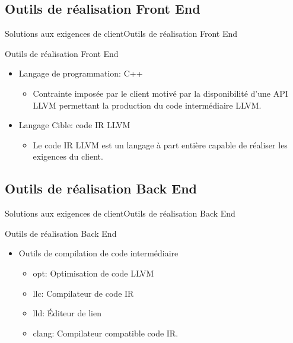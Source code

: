    \subsection{Outils de réalisation Front End}
      \begin{frame}{Solutions aux exigences de client}{Outils de réalisation Front End}
        \begin{block}{Outils de réalisation Front End}
          \begin{itemize}
            \item<1-> Langage de programmation: C++
            \begin{itemize}
              \item<2-> Contrainte imposée par le client motivé par la disponibilité d'une API LLVM permettant la production du code intermédiaire LLVM.
            \end{itemize}
            \item<3-> Langage Cible: code IR LLVM
            \begin{itemize}
              \item<4-> Le code IR LLVM est un langage à part entière capable de réaliser les exigences du client. 
            \end{itemize}
          \end{itemize}
        \end{block}
      \end{frame}
    \subsection{Outils de réalisation Back End}
      \begin{frame}{Solutions aux exigences de client}{Outils de réalisation Back End}
        \begin{block}{Outils de réalisation Back End}
          \begin{itemize}
            \item<1-> Outils de compilation de code intermédiaire
            \begin{itemize}
              \item<2-> opt: Optimisation de code LLVM
              \item<3-> llc: Compilateur de code IR
              \item<4-> lld: Éditeur de lien
              \item<5-> clang: Compilateur compatible code IR.
            \end{itemize}
            
          \end{itemize}
        \end{block}
      \end{frame}
